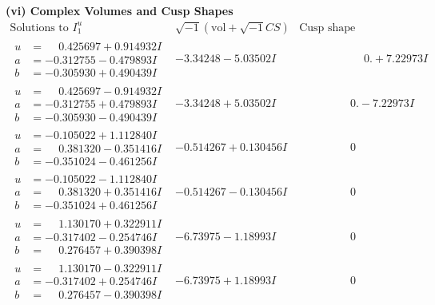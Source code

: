 \documentclass[1p]{elsarticle_modified}
\theoremstyle{definition}
\newcommand{\I}{\sqrt{-1}}
\begin{document}
\newpage\flushleft \textbf{(vi) Complex Volumes and Cusp Shapes}
$$\begin{array}{c|c|c}  
\text{Solutions to }I^u_{1}& \I (\text{vol} + \sqrt{-1}CS) & \text{Cusp shape}\\
 \hline 
\begin{aligned}
u &= \phantom{-}0.425697 + 0.914932 I \\
a &= -0.312755 - 0.479893 I \\
b &= -0.305930 + 0.490439 I\end{aligned}
 & -3.34248 - 5.03502 I & \phantom{-0.000000 -}0. + 7.22973 I \\ \hline\begin{aligned}
u &= \phantom{-}0.425697 - 0.914932 I \\
a &= -0.312755 + 0.479893 I \\
b &= -0.305930 - 0.490439 I\end{aligned}
 & -3.34248 + 5.03502 I & \phantom{-0.000000 } 0. - 7.22973 I \\ \hline\begin{aligned}
u &= -0.105022 + 1.112840 I \\
a &= \phantom{-}0.381320 - 0.351416 I \\
b &= -0.351024 - 0.461256 I\end{aligned}
 & -0.514267 + 0.130456 I & \phantom{-0.000000 } 0 \\ \hline\begin{aligned}
u &= -0.105022 - 1.112840 I \\
a &= \phantom{-}0.381320 + 0.351416 I \\
b &= -0.351024 + 0.461256 I\end{aligned}
 & -0.514267 - 0.130456 I & \phantom{-0.000000 } 0 \\ \hline\begin{aligned}
u &= \phantom{-}1.130170 + 0.322911 I \\
a &= -0.317402 - 0.254746 I \\
b &= \phantom{-}0.276457 + 0.390398 I\end{aligned}
 & -6.73975 - 1.18993 I & \phantom{-0.000000 } 0 \\ \hline\begin{aligned}
u &= \phantom{-}1.130170 - 0.322911 I \\
a &= -0.317402 + 0.254746 I \\
b &= \phantom{-}0.276457 - 0.390398 I\end{aligned}
 & -6.73975 + 1.18993 I & \phantom{-0.000000 } 0 \\ \hline\begin{aligned}

\end{aligned}
\end{array}$$
\end{document}
